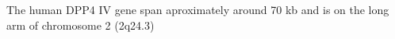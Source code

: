 The human DPP4 IV gene span aproximately around 70 kb and is  on the long arm of chromosome 2 (2q24.3)